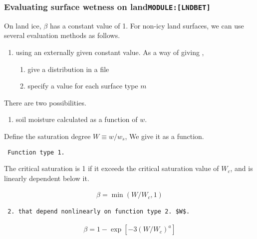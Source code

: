 \hypertarget{evaluating-surface-wetness-on-landmodulelndbet}{%
\subsubsection{\texorpdfstring{Evaluating surface wetness on
land\texttt{MODULE:{[}LNDBET{]}}}{Evaluating surface wetness on landMODULE:{[}LNDBET{]}}}\label{evaluating-surface-wetness-on-landmodulelndbet}}

On land ice, \(\beta\) has a constant value of 1. For non-icy land
surfaces, we can use several evaluation methods as follows.

\begin{enumerate}
\def\labelenumi{\arabic{enumi}.}
\item
  using an externally given constant value. As a way of giving ,

  \begin{enumerate}
  \def\labelenumii{\arabic{enumii}.}
  \item
    give a distribution in a file
  \item
    specify a value for each surface type \(m\)
  \end{enumerate}
\end{enumerate}

There are two possibilities.

\begin{enumerate}
\def\labelenumi{\arabic{enumi}.}
\setcounter{enumi}{1}
\tightlist
\item
  soil moisture calculated as a function of \(w\).
\end{enumerate}

Define the saturation degree \(W \equiv w/w_s\), We give it as a
function.

\begin{verbatim}
 Function type 1.
\end{verbatim}

The critical saturation is 1 if it exceeds the critical saturation value
of \(W_c\), and is linearly dependent below it.

\begin{eqnarray}
          \beta = \min \left( W/W_c, 1 \right)
\end{eqnarray}

\begin{verbatim}
 2. that depend nonlinearly on function type 2. $W$.
\end{verbatim}

\begin{eqnarray}
          \beta = 1-\exp \left[-3(W/W_c)^{a} \right]
\end{eqnarray}

